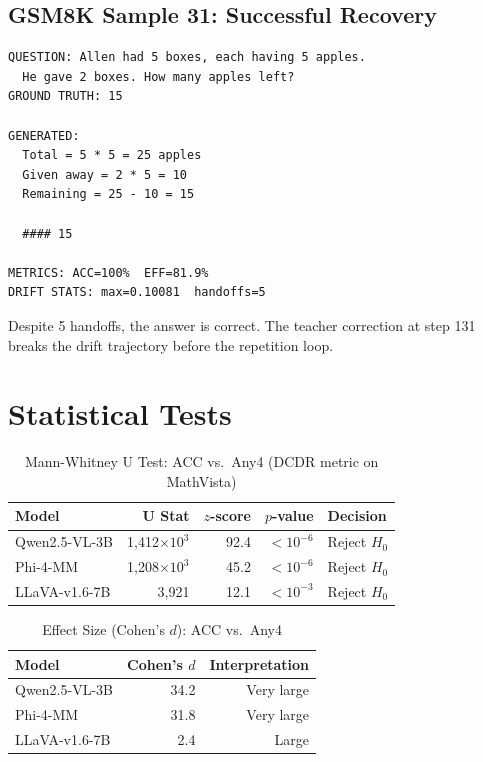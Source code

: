 \documentclass[runningheads]{article} %
\begin{document}
\subsection{GSM8K Sample 31: Successful Recovery}

\begin{lstlisting}[caption={GSM8K Sample 31 -- Successful Recovery}]
QUESTION: Allen had 5 boxes, each having 5 apples.
  He gave 2 boxes. How many apples left?
GROUND TRUTH: 15

GENERATED:
  Total = 5 * 5 = 25 apples
  Given away = 2 * 5 = 10
  Remaining = 25 - 10 = 15

  #### 15

METRICS: ACC=100%  EFF=81.9%
DRIFT STATS: max=0.10081  handoffs=5
\end{lstlisting}

Despite 5 handoffs, the answer is correct. The teacher correction
at step 131 breaks the drift trajectory before the repetition loop.

\section{Statistical Tests}
\label{app:stats}

\begin{table}[H]
\centering
\caption{Mann-Whitney U Test: ACC vs.\ Any4 (DCDR metric on MathVista)}
\begin{tabular}{@{}lrrrl@{}}
\toprule
\textbf{Model} & \textbf{U Stat} & \textbf{$z$-score} & \textbf{$p$-value} & \textbf{Decision} \\
\midrule
Qwen2.5-VL-3B  & 1,412$\times 10^3$ & 92.4 & $<10^{-6}$ & Reject $H_0$ \\
Phi-4-MM       & 1,208$\times 10^3$ & 45.2 & $<10^{-6}$ & Reject $H_0$ \\
LLaVA-v1.6-7B  & 3,921              & 12.1  & $<10^{-3}$ & Reject $H_0$ \\
\bottomrule
\end{tabular}
\end{table}

\begin{table}[H]
\centering
\caption{Effect Size (Cohen's $d$): ACC vs.\ Any4}
\begin{tabular}{@{}lrr@{}}
\toprule
\textbf{Model} & \textbf{Cohen's $d$} & \textbf{Interpretation} \\
\midrule
Qwen2.5-VL-3B  & 34.2 & Very large \\
Phi-4-MM       & 31.8 & Very large \\
LLaVA-v1.6-7B  & 2.4  & Large \\
\bottomrule
\end{tabular}
\end{table}
\end{document}
